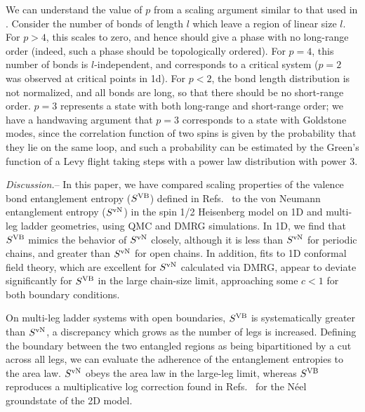 \documentclass[prl,aps,twocolumn,floatfix,amsmath,amssymb,superscriptaddress,tightenlines]{revtex4}
\begin{document}
We can understand the value of $p$ from a scaling argument similar to that used in \cite{network}.
Consider the number of bonds of length $l$ which leave a region of linear size $l$.  For $p>4$, this
scales to zero, and hence should give a phase with no long-range order (indeed, such a phase should
be topologically ordered).  For $p=4$, this number of bonds is $l$-independent, and corresponds to a critical
system ($p=2$ was observed at critical points in 1d\cite{1dcritical}).
For $p<2$, the bond length distribution is not normalized, and all bonds are long, so that
there should be no short-range order.  $p=3$ represents a state with both long-range
and short-range order; we have a handwaving argument that $p=3$ corresponds to a state
with Goldstone modes, since the correlation function of two spins is given by the
probability that they lie on the same loop, and such a probability can be estimated by
the Green's function of a Levy flight taking steps with a power law distribution with power $3$.



{\it Discussion.}-- In this paper, we have compared scaling properties of
the valence bond entanglement entropy ($S^{\rm VB}$) defined in
Refs.~\cite{Alet,Chh} to the von Neumann entanglement entropy ($S^{ \rm vN}$) in the
spin 1/2 Heisenberg model on 1D and multi-leg ladder geometries, using QMC and DMRG simulations.
In 1D, we find
that $S^{\rm VB}$ mimics the behavior of $S^{ \rm vN}$ closely, although 
it is less than $S^{ \rm vN}$ for periodic
chains, and greater than $S^{ \rm vN}$ for open chains. In addition, fits to
1D conformal field theory, which are excellent for $S^{ \rm vN}$ calculated
via DMRG, appear to deviate significantly for $S^{\rm VB}$ in the large
chain-size limit, approaching some $c<1$ for both boundary conditions.

On multi-leg ladder systems with open boundaries, $S^{\rm VB}$ is
systematically greater than $S^{ \rm vN}$, a discrepancy which grows as the
number of legs is increased.  Defining the boundary between the two
entangled regions as being bipartitioned by a cut across all legs, we can
evaluate the adherence of the entanglement entropies to the area law.  $S^{ \rm vN}$ obeys the area law in the large-leg limit, whereas $S^{\rm VB}$
 reproduces a multiplicative log correction found in
Refs.~\cite{Alet,Chh} for the N\'eel groundstate of the 2D
model.
\end{document}
